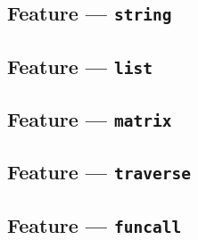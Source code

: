 
\subsection{Feature --- \texttt{string}} %
\label{sub:feature_string}


\subsection{Feature --- \texttt{list}} %
\label{sub:feature_list}


\subsection{Feature --- \texttt{matrix}} %
\label{sub:feature_matrix}


\subsection{Feature --- \texttt{traverse}} %
\label{sub:feature_traverse}


\subsection{Feature --- \texttt{funcall}} %
\label{sub:feature_funcall}



